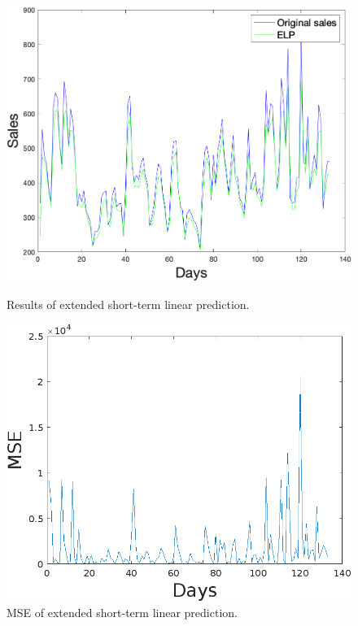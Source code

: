     \begin{figure}[h]
        \centering
        \begin{minipage}{0.45\textwidth}
            \centering
            \includegraphics[width=1\textwidth]{figures/expELP.png}
            \caption{Results of extended short-term linear prediction.}
            \label{fig:eslpres}
        \end{minipage}\hfill
        \begin{minipage}{0.45\textwidth}
            \centering
            \includegraphics[width=1\textwidth]{figures/expMseELP.png}
            \caption{MSE of extended short-term linear prediction.}
            \label{fig:eslpmse}
        \end{minipage}
    \end{figure}

